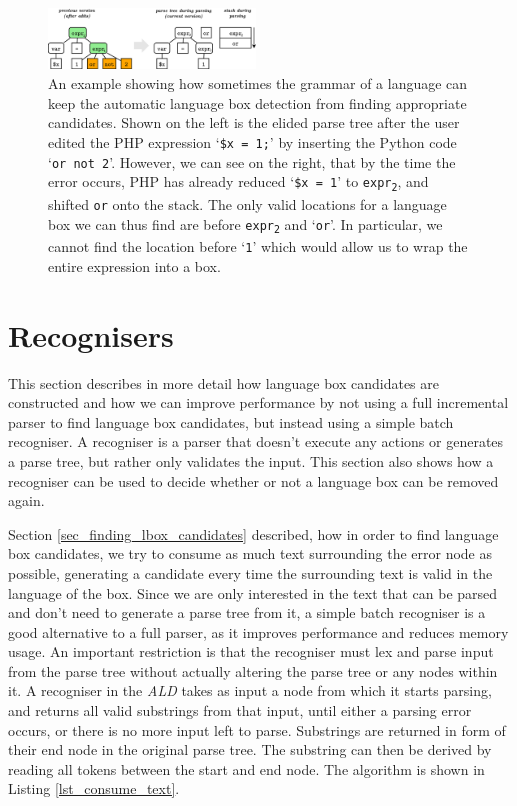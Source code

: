 \documentclass[sigplan,screen]{acmart}\settopmatter{printfolios=true,printccs=false,printacmref=false}
\newcommand{\ald}[0]{\emph{ALD}\xspace}
\newcommand{\qtt}[1]{`\texttt{#1}'\xspace}
\begin{document}
\begin{figure}
\begin{center}
\includegraphics[width=0.49\textwidth]{images/limitation_php}
\end{center}
\caption{An example showing how sometimes the grammar of a language can
keep the automatic language box detection from finding appropriate candidates.
Shown on the left is the elided parse tree after the user edited the PHP expression
\qtt{\$x = 1;} by inserting the Python code \qtt{or not 2}. However, we
can see on the right, that by the time the error occurs, PHP has already reduced \qtt{\$x = 1} to \texttt{expr\textsubscript{2}}, and shifted
\texttt{or} onto the stack. The only valid locations for a language
box we can thus find are before \texttt{expr\textsubscript{2}} and \qtt{or}. In particular,
we cannot find the location before \qtt{1} which would allow us to wrap the entire expression
into a box.}
\label{fig_auto_phplimit}
\end{figure}

\section{Recognisers}
\label{sec:impl_defaultrec}

This section describes in more detail how language box candidates are
constructed and how we can improve performance by not using a full incremental
parser to find language box candidates, but instead using a simple batch
recogniser. A recogniser is a parser that doesn't execute any actions or
generates a parse tree, but rather only validates the input. This section also
shows how a recogniser can be used to decide whether or not a language box can
be removed again.

Section \ref{sec_finding_lbox_candidates} described, how in order to find
language box candidates, we try to consume as much text surrounding the error
node as possible, generating a candidate every time the surrounding text is
valid in the language of the box. Since we are only interested in the text that
can be parsed and don't need to generate a parse tree from it, a simple batch
recogniser is a good alternative to a full parser, as it improves performance
and reduces memory usage.  An important restriction is that the recogniser must
lex and parse input from the parse tree without actually altering the parse
tree or any nodes within it.  A recogniser in the \ald takes as input a node
from which it starts parsing, and returns all valid substrings from that input,
until either a parsing error occurs, or there is no more input left to parse.
Substrings are returned in form of their end node in the original parse tree.
The substring can then be derived by reading all tokens between the start and
end node.  The algorithm is shown in Listing \ref{lst_consume_text}.
\end{document}
